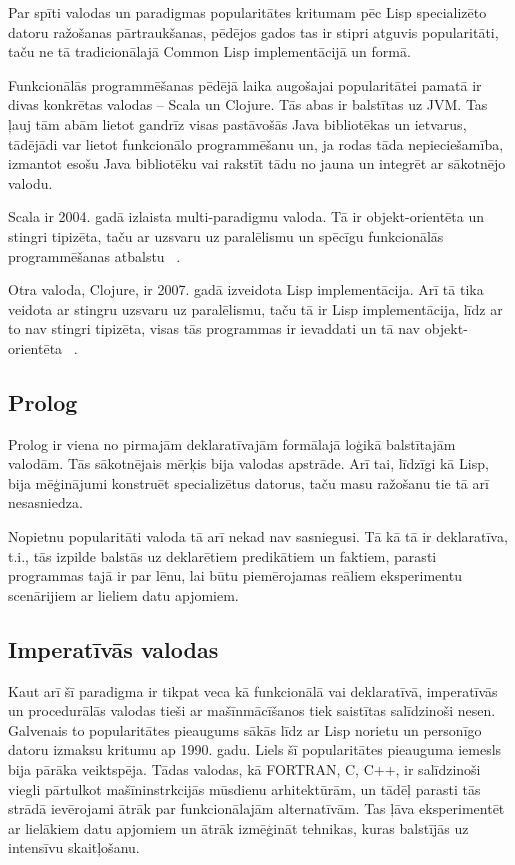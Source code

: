 \documentclass{ludis}
\begin{document}
Par spīti valodas un paradigmas popularitātes kritumam pēc Lisp specializēto datoru ražošanas pārtraukšanas, pēdējos gados tas ir stipri atguvis popularitāti, taču ne tā tradicionālajā Common Lisp implementācijā un formā.

Funkcionālās programmēšanas pēdējā laika augošajai popularitātei pamatā ir divas konkrētas valodas -- Scala un Clojure. Tās abas ir balstītas uz JVM. Tas ļauj tām abām lietot gandrīz visas pastāvošās Java bibliotēkas un ietvarus, tādējādi var lietot funkcionālo programmēšanu un, ja rodas tāda nepieciešamība, izmantot esošu Java bibliotēku vai rakstīt tādu no jauna un integrēt ar sākotnējo valodu.

Scala ir 2004. gadā izlaista multi-paradigmu valoda. Tā ir objekt-orientēta un stingri tipizēta, taču ar uzsvaru uz paralēlismu un spēcīgu funkcionālās programmēšanas atbalstu ~\cite{scala_org}.

Otra valoda, Clojure, ir 2007. gadā izveidota Lisp implementācija. Arī tā tika veidota ar stingru uzsvaru uz paralēlismu, taču tā ir Lisp implementācija, līdz ar to nav stingri tipizēta, visas tās programmas ir ievaddati un tā nav objekt-orientēta ~\cite{clojure_org}.

\subsection{Prolog}
Prolog ir viena no pirmajām deklaratīvajām formālajā loģikā balstītajām valodām. Tās sākotnējais mērķis bija valodas apstrāde. Arī tai, līdzīgi kā Lisp, bija mēģinājumi konstruēt specializētus datorus, taču masu ražošanu tie tā arī nesasniedza.

Nopietnu popularitāti valoda tā arī nekad nav sasniegusi. Tā kā tā ir deklaratīva, t.i., tās izpilde balstās uz deklarētiem predikātiem un faktiem, parasti programmas tajā ir par lēnu, lai būtu piemērojamas reāliem eksperimentu scenārijiem ar lieliem datu apjomiem.

\subsection{Imperatīvās valodas}
 Kaut arī šī paradigma ir tikpat veca kā funkcionālā vai deklaratīvā, imperatīvās un procedurālās valodas tieši ar mašīnmācīšanos tiek saistītas salīdzinoši nesen. Galvenais to popularitātes pieaugums sākās līdz ar Lisp norietu un personīgo datoru izmaksu kritumu ap 1990. gadu. Liels šī popularitātes pieauguma iemesls bija pārāka veiktspēja. Tādas valodas, kā FORTRAN, C, C++, ir salīdzinoši viegli pārtulkot mašīninstrkcijās mūsdienu arhitektūrām, un tādēļ parasti tās strādā ievērojami ātrāk par funkcionālajām alternatīvām. Tas ļāva eksperimentēt ar lielākiem datu apjomiem un ātrāk izmēģināt tehnikas, kuras balstījās uz intensīvu skaitļošanu.
\end{document}
